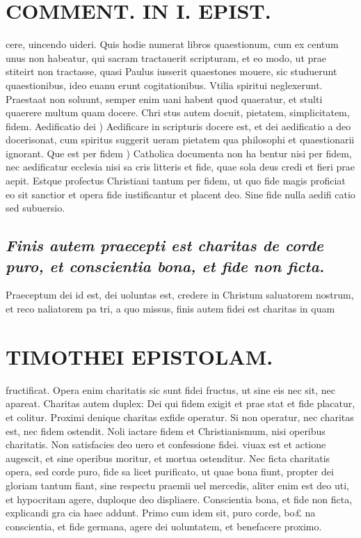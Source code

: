 \documentclass{article}
\begin{document}
\begin{pages}
\section*{COMMENT. IN I. EPIST. }
\marginpar{[ p.14 ]}\pstart cere, uincendo uideri. Quis hodie numerat libros quaestionum, cum ex centum unus non habeatur, qui sacram tractauerit scripturam, et eo modo, ut prae stiteirt non tractasse, quasi Paulus iusserit quaestones mouere, sic studuerunt quaestionibus, ideo euanu erunt cogitationibus. Vtilia spiritui neglexerunt. Praestaat non soluunt, semper enim uani habent quod quaeratur, et stulti quaerere multum quam docere. Chri stus autem docuit, pietatem, simplicitatem, fidem. Aedificatio dei ) Aedificare in scripturis docere est, et dei aedificatio a deo docerisonat, cum spiritus suggerit ueram pietatem qua philosophi et quaestionarii ignorant.  \pend\pstart Que est per fidem ) Catholica documenta non ha bentur nisi per fidem, nec aedificatur ecclesia nisi sa cris litteris et fide, quae sola deus credi et fieri prae aepit. Estque profectus Christiani tantum per fidem, ut quo fide magis proficiat eo sit sanctior et opera fide iustificantur et placent deo. Sine fide nulla aedifi catio sed subuersio.  \pend
{}
{}
\subsection*{\textit{Finis autem praecepti est charitas de corde puro, et conscientia bona, et fide non ficta. }}\pstart Praeceptum dei id est, dei uoluntas est, credere in Christum saluatorem nostrum, et reco naliatorem pa tri, a quo missus, finis autem fidei est charitas in quam  \pend
\section*{TIMOTHEI EPISTOLAM. }
\marginpar{[ p.15 ]}\pstart fructificat. Opera enim charitatis sic sunt fidei fructus, ut sine eis nec sit, nec apareat. Charitas autem duplex: Dei qui fidem exigit et prae stat et fide placatur, et colitur. Proximi denique charitas exfide operatur. Si non operatur, nec charitas est, nec fidem ostendit. Noli iactare fidem et Christianismum, nisi operibus charitatis. Non satisfacies deo uero et confessione fidei. viuax est et actione augescit, et sine operibus moritur, et mortua ostenditur.  \pend\pstart Nec ficta charitatis opera, sed corde puro, fide sa licet purificato, ut quae bona fiunt, propter dei gloriam tantum fiant, sine respectu praemii uel mercedis, aliter enim est deo uti, et hypocritam agere, duploque deo displiaere.  \pend\pstart Conscientia bona, et fide non ficta, explicandi gra cia haec addunt. Primo cum idem sit, puro corde, bo£ na conscientia, et fide germana, agere dei uoluntatem, et benefacere proximo.  \pend
{}
{}

\end{pages}
\end{document}

